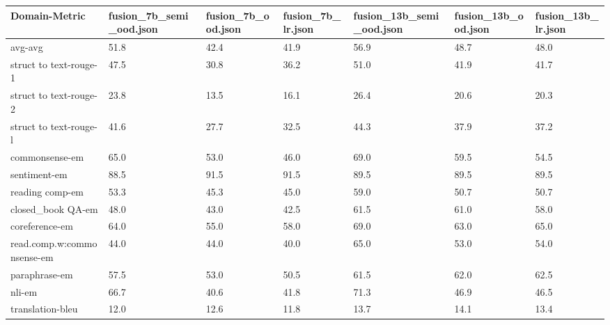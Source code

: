 \begin{tabular}{lllllll}
\toprule
Domain-Metric & fusion_7b_semi_ood.json & fusion_7b_ood.json & fusion_7b_lr.json & fusion_13b_semi_ood.json & fusion_13b_ood.json & fusion_13b_lr.json \\
\midrule
avg-avg & 51.8 & 42.4 & 41.9 & 56.9 & 48.7 & 48.0 \\
struct to text-rouge-1 & 47.5 & 30.8 & 36.2 & 51.0 & 41.9 & 41.7 \\
struct to text-rouge-2 & 23.8 & 13.5 & 16.1 & 26.4 & 20.6 & 20.3 \\
struct to text-rouge-l & 41.6 & 27.7 & 32.5 & 44.3 & 37.9 & 37.2 \\
commonsense-em & 65.0 & 53.0 & 46.0 & 69.0 & 59.5 & 54.5 \\
sentiment-em & 88.5 & 91.5 & 91.5 & 89.5 & 89.5 & 89.5 \\
reading comp-em & 53.3 & 45.3 & 45.0 & 59.0 & 50.7 & 50.7 \\
closed_book QA-em & 48.0 & 43.0 & 42.5 & 61.5 & 61.0 & 58.0 \\
coreference-em & 64.0 & 55.0 & 58.0 & 69.0 & 63.0 & 65.0 \\
read.comp.w:commonsense-em & 44.0 & 44.0 & 40.0 & 65.0 & 53.0 & 54.0 \\
paraphrase-em & 57.5 & 53.0 & 50.5 & 61.5 & 62.0 & 62.5 \\
nli-em & 66.7 & 40.6 & 41.8 & 71.3 & 46.9 & 46.5 \\
translation-bleu & 12.0 & 12.6 & 11.8 & 13.7 & 14.1 & 13.4 \\
\bottomrule
\end{tabular}

